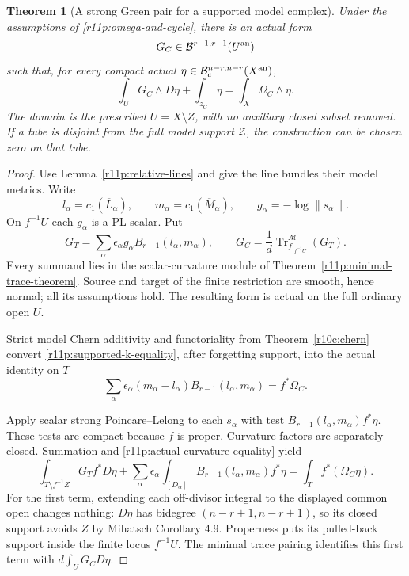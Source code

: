 \documentclass[11pt]{article}
\newtheorem{theorem}{Theorem}[section]
\theoremstyle{definition}
\theoremstyle{remark}
\numberwithin{equation}{section}
\begin{document}
\begin{theorem}[A strong Green pair for a supported model complex]
\label{r11p:complex-green}
Under the assumptions of \eqref{r11p:omega-and-cycle}, there is an
actual form
\[
                       G_C\in\mathcal B^{r-1,r-1}(U^{\rm an})
\]
such that, for every compact actual
$\eta\in\mathcal B_c^{n-r,n-r}(X^{\rm an})$,
\[
                 \int_UG_C\wedge D\eta+\int_{z_C}\eta
                                     =\int_X\Omega_C\wedge\eta.
\tag{PC7}\label{r11p:complex-green-equation}
\]
The domain is the prescribed $U=X\setminus Z$, with no auxiliary
closed subset removed.  If a tube is disjoint from the full model
support $\mathcal Z$, the construction can be chosen zero on that tube.
\end{theorem}

\begin{proof}
Use Lemma~\ref{r11p:relative-lines} and give the line bundles their
model metrics.  Write
\[
 l_\alpha=c_1(\overline L_\alpha),\qquad
 m_\alpha=c_1(\overline M_\alpha),\qquad
 g_\alpha=-\log\|s_\alpha\|.
\]
On $f^{-1}U$ each $g_\alpha$ is a PL scalar.  Put
\[
       G_T=\sum_\alpha\epsilon_\alpha
                    g_\alpha B_{r-1}(l_\alpha,m_\alpha),
       \qquad
       G_C=\frac1d\operatorname{Tr}^{\mathscr M}_{f|_{f^{-1}U}}(G_T).
\tag{PC8}\label{r11p:complex-green-formula}
\]
Every summand lies in the scalar-curvature module of
Theorem~\ref{r11p:minimal-trace-theorem}.  Source and target of the
finite restriction are smooth, hence normal; all its assumptions hold.
The resulting form is actual on the full ordinary open $U$.

Strict model Chern additivity and functoriality from Theorem~\ref{r10c:chern} convert
\eqref{r11p:supported-k-equality}, after forgetting support, into
the actual identity on $T$
\[
 \sum_\alpha\epsilon_\alpha
             (m_\alpha-l_\alpha)B_{r-1}(l_\alpha,m_\alpha)
                                      =f^*\Omega_C.
\tag{PC9}\label{r11p:actual-curvature-equality}
\]


Apply scalar strong Poincare--Lelong to each $s_\alpha$ with test
$B_{r-1}(l_\alpha,m_\alpha)f^*\eta$.  These tests are compact because
$f$ is proper.  Curvature factors are separately closed.  Summation
and \eqref{r11p:actual-curvature-equality} yield
\[
 \int_{T\setminus f^{-1}Z}G_Tf^*D\eta
 +\sum_\alpha\epsilon_\alpha
       \int_{[D_\alpha]}B_{r-1}(l_\alpha,m_\alpha)f^*\eta
                         =\int_Tf^*(\Omega_C\eta).
\tag{PC10}\label{r11p:upstairs-complex-PL}
\]
For the first term, extending each off-divisor integral to the
displayed common open changes nothing: $D\eta$ has bidegree
$(n-r+1,n-r+1)$, so its closed support avoids $Z$ by
Mihatsch Corollary 4.9.  Properness puts its pulled-back support
inside the finite locus $f^{-1}U$.  The minimal trace pairing identifies
this first term with $d\int_UG_CD\eta$.


\end{proof}
\end{document}
